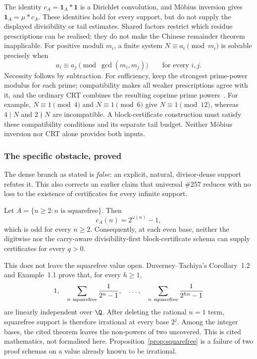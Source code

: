 The identity $c_A=\mathbf1_A*\mathbf1$ is a Dirichlet convolution,
and M\"obius inversion gives $\mathbf1_A=\mu*c_A$.  These identities
hold for every support, but do not supply the displayed divisibility
or tail estimates.  Shared factors restrict which residue prescriptions
can be realised; they do not make the Chinese remainder theorem
inapplicable.  For positive moduli $m_i$, a finite system
$N\equiv a_i\pmod{m_i}$ is solvable precisely when
\[
 a_i\equiv a_j\pmod{\gcd(m_i,m_j)}\qquad\text{for every }i,j.
\]
Necessity follows by subtraction.  For sufficiency, keep the strongest
prime-power modulus for each prime; compatibility makes all weaker
prescriptions agree with it, and the ordinary CRT combines the
resulting coprime prime powers~\cite[Theorem~3.1, pp.~2--3]{conradcrt}.
For example, $N\equiv1\pmod4$ and $N\equiv1\pmod6$ give
$N\equiv1\pmod{12}$, whereas $4\mid N$ and $2\nmid N$ are
incompatible.  A block-certificate construction must satisfy these
compatibility conditions and its separate tail budget.  Neither
M\"obius inversion nor CRT alone provides both inputs.

\subsubsection*{The specific obstacle, proved}

The dense branch as stated is \emph{false}: an explicit, natural, divisor-dense support refutes
it.  This also corrects an earlier claim that universal \#257 reduces with no loss to the
existence of certificates for every infinite support.

\begin{prop}
\label{prop:squarefree}
Let $A=\{n\ge2:n\text{ is squarefree}\}$.  Then
\[
  c_{A}(n)=2^{\omega(n)}-1,
\]
which is odd for every $n\ge2$.  Consequently, at each even base, neither the
digitwise nor the carry-aware divisibility-first block-certificate schema can
supply certificates for every $q>0$.
\end{prop}

This does not leave the squarefree value open.  Duverney--Tachiya's
Corollary~1.2 and Example~1.1 prove that, for every $h\ge1$,
\[
  1,\quad
  \sum_{n\ {\rm squarefree}}\frac1{2^n-1},\quad\ldots,\quad
  \sum_{n\ {\rm squarefree}}\frac1{2^{hn}-1}
\]
are linearly independent over $\Q$.  After deleting the rational $n=1$
term, squarefree support is therefore irrational at every base $2^j$.
Among the integer bases, the cited theorem leaves the non-powers of two
uncovered.  This is cited mathematics, not formalised here.  Proposition~\ref{prop:squarefree}
is a failure of two proof schemas on a value already known to be irrational.

